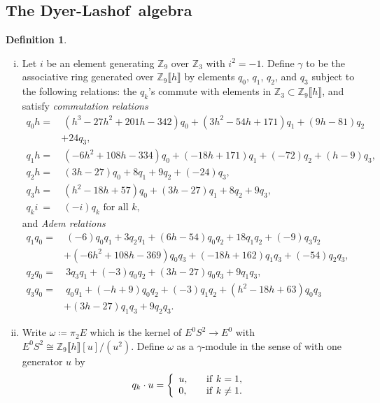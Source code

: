 \documentclass{gtpart}
\theoremstyle{definition}
\newtheorem{defn}[thm]{Definition}
\theoremstyle{remark}
\newcommand{\mb}[1]{\mathbb{#1}}
\newcommand{\DL}{Dyer-Lashof~}
\newcommand{\BZ}{{\mb Z}}
\newcommand{\g}{\gamma}
\begin{document}
\subsection{The \DL algebra}

\begin{defn}
\label{def:go}
 \mbox{}
 \begin{enumerate}[(i)]
  \item \label{go(i)} Let $i$ be an element generating $\BZ_9$ over 
  $\BZ_3$ with $i^2 = -1$.  Define $\g$ to be the associative ring 
  generated over $\BZ_9 \llbracket h \rrbracket$ by elements $q_0$, 
  $q_1$, $q_2$, and $q_3$ subject to the following relations: the 
  $q_k$'s commute with elements in 
  $\BZ_3 \subset \BZ_9 \llbracket h \rrbracket$, and satisfy {\em 
  commutation relations} 
  \begin{equation*}
  \begin{split}
   q_0 h = & ~ (h^3 - 27 h^2 + 201 h - 342) q_0 + (3 h^2 - 54 h + 171) q_1 + (9 h - 81) q_2 \\
           & + 24 q_3, \\
   q_1 h = & ~ (-6 h^2 + 108 h - 334) q_0 + (-18 h + 171) q_1 + (-72) q_2 + (h - 9) q_3, \\
   q_2 h = & ~ (3 h - 27) q_0 + 8 q_1 + 9 q_2 + (-24) q_3, \\
   q_3 h = & ~ (h^2 - 18 h + 57) q_0 + (3 h - 27) q_1 + 8 q_2 + 9 q_3, \\
   q_k i ~ = & ~ (-i) q_k \text{~for all~} k, 
  \end{split}
  \end{equation*}
  and {\em Adem relations} 
  \begin{equation*}
  \begin{split}
   q_1q_0 = & ~ (-6) q_0q_1 + 3 q_2q_1 + (6 h - 54) q_0q_2 + 18 q_1q_2 + (-9) q_3q_2 \\
            & + (-6 h^2 + 108 h - 369) q_0q_3 + (-18 h + 162) q_1q_3 + (-54) q_2q_3, \quad~~ \\
   q_2q_0 = & ~ 3 q_3q_1 + (-3) q_0q_2 + (3 h - 27) q_0q_3 + 9 q_1q_3, \\
   q_3q_0 = & ~ q_0q_1 + (-h + 9) q_0q_2 + (-3) q_1q_2 + (h^2 - 18 h + 63) q_0q_3 \\
            & + (3 h - 27) q_1q_3 + 9 q_2q_3.  
  \end{split}
  \end{equation*}

  \item \label{go(ii)} Write $\omega \coloneqq \pi_2 E$ which is the 
  kernel of $E^0 S^2 \to E^0$ with 
  $E^0 S^2 \cong \BZ_9 \llbracket h \rrbracket [u] / (u^2)$.  Define 
  $\omega$ as a $\g$-module in the sense of \cite[2.2]{h2p2} with one 
  generator $u$ by 
  \[
   q_k \cdot u = \left\{
   \begin{array}{ll}
     u,  & \quad {\rm if}~k = 1, \\
     0,  & \quad {\rm if}~k \neq 1.  \\
   \end{array}
   \right.
  \]
 \end{enumerate}
\end{defn}
\end{document}
